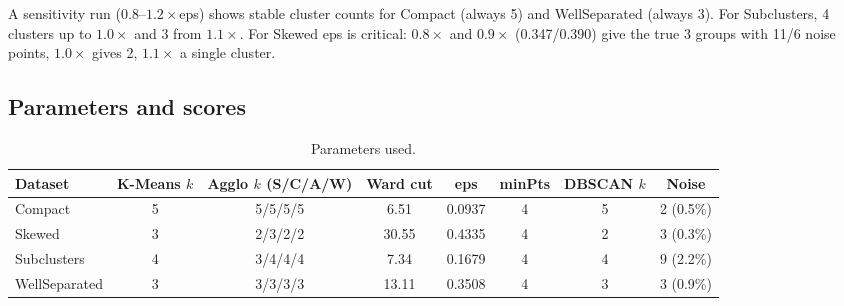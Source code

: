 \documentclass[11pt]{article}
\begin{document}
A sensitivity run ($0.8$--$1.2\times$eps) shows stable cluster counts for Compact (always 5) and
WellSeparated (always 3). For Subclusters, 4 clusters up to $1.0\times$ and 3 from $1.1\times$. For
Skewed eps is critical: $0.8\times$ and $0.9\times$ (0.347/0.390) give the true 3 groups with 11/6
noise points, $1.0\times$ gives 2, $1.1\times$ a single cluster.

\subsection{Parameters and scores}
\begin{table}[H]\centering\small
\caption{Parameters used.}\label{tab:params}\setlength{\tabcolsep}{4pt}
\begin{tabular}{@{}lccccccc@{}}\toprule
Dataset & K-Means $k$ & Agglo $k$ (S/C/A/W) & Ward cut & eps & minPts & DBSCAN $k$ & Noise\\\midrule
Compact & 5 & 5/5/5/5 & 6.51 & 0.0937 & 4 & 5 & 2 (0.5\%)\\
Skewed & 3 & 2/3/2/2 & 30.55 & 0.4335 & 4 & 2 & 3 (0.3\%)\\
Subclusters & 4 & 3/4/4/4 & 7.34 & 0.1679 & 4 & 4 & 9 (2.2\%)\\
WellSeparated & 3 & 3/3/3/3 & 13.11 & 0.3508 & 4 & 3 & 3 (0.9\%)\\\bottomrule
\end{tabular}\end{table}
\end{document}
